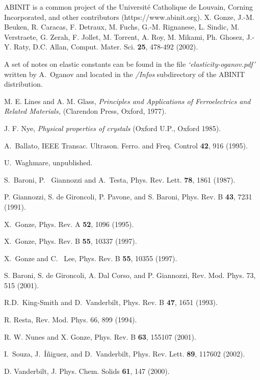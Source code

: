 \documentclass[11pt,fleqn]{article}
\begin{document}
\begin{thebibliography}{99}

 {\sf ABINIT} is a common project of the
Universit\'{e} Catholique de Louvain,
Corning Incorporated, and other contributors (https://www.abinit.org).
X. Gonze, J.-M. Beuken, R. Caracas, F. Detraux, M. Fuchs, G.-M. Rignanese,
L. Sindic, M. Verstraete, G. Zerah, F. Jollet, M. Torrent, A. Roy,
M. Mikami, Ph. Ghosez, J.-Y. Raty, D.C. Allan,
Comput. Mater. Sci. {\bf 25}, 478-492 (2002).

A set of notes on elastic constants can be found in the file
{\sl `elasticity-oganov.pdf'} written by A.~Oganov and located in
the {\sl /Infos} subdirectory of the {\sf ABINIT} distribution.

 M. E. Lines and A. M. Glass, {\it Principles and
Applications of Ferroelectrics and Related Materials,} (Clarendon
Press, Oxford, 1977).

 J. F. Nye, {\it Physical properties of crystals}
(Oxford U.P., Oxford 1985).

 A.~Ballato, IEEE Transac. Ultrason. Ferro. and
Freq. Control {\bf 42}, 916 (1995).

 U.~Waghmare, unpublished.

 S.~Baroni, P. ~Giannozzi and A.~Testa,
Phys. Rev. Lett. {\bf 78}, 1861 (1987).

 P. Giannozzi, S. de Gironcoli, P. Pavone, and S. Baroni,
Phys. Rev. B {\bf 43}, 7231 (1991).

 X.~Gonze, Phys. Rev. A {\bf 52}, 1096 (1995).

  X.~Gonze,
Phys. Rev. B {\bf 55}, 10337 (1997).

 X.~Gonze and C. ~Lee, Phys. Rev. B {\bf 55}, 10355 (1997).

 S. Baroni, S. de Gironcoli, A. Dal Corso,
and P. Giannozzi, Rev. Mod. Phys. 73, 515 (2001).

 R.D.~King-Smith and D.~Vanderbilt,
Phys. Rev. B {\bf 47}, 1651 (1993).

 R. Resta, Rev. Mod. Phys. 66, 899 (1994).

 R. W. Nunes and X. Gonze, Phys. Rev. B {\bf 63}, 155107
(2001).

 I.~Souza, J.~\'I\~niguez, and D.~Vanderbilt,
Phys. Rev. Lett. {\bf 89}, 117602 (2002).

 D. Vanderbilt, J. Phys. Chem. Solids {\bf 61}, 147 (2000).

\end{thebibliography}
\end{document}
